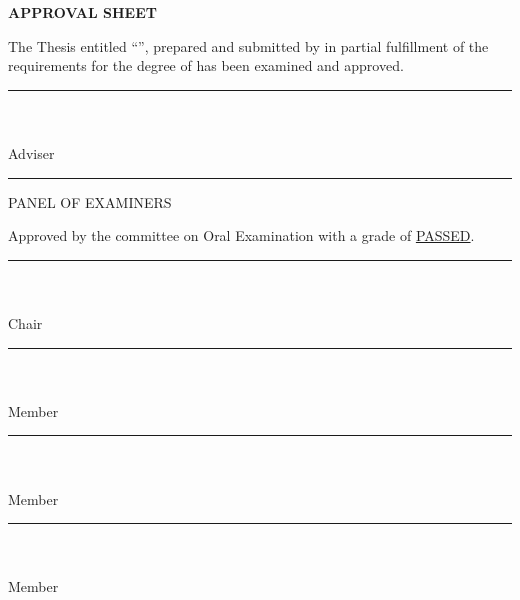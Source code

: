 \ifcitcproposal\else
\clearpage
\thispagestyle{empty}
\begin{center}\textbf{APPROVAL SHEET}\end{center}
\vspace{1\baselineskip}

\begingroup
\setlength{\parindent}{1.25cm}\linespread{1.35}\selectfont
The Thesis entitled ``\textbf{\citcTitleInline}'', prepared and submitted by
\textbf{\citcAuthorsInline} in partial fulfillment of the requirements for the
degree of \textbf{\citcDegree} has been examined and approved.
\par
\endgroup

\vspace{2\baselineskip}
\begin{center}
\rule{7.5cm}{0.4pt}\\
\textbf{\citcAdviser}\\
Adviser
\end{center}

\vspace{1\baselineskip}
\begin{center}\rule{\linewidth}{1.2pt}\end{center}
\begin{center}PANEL OF EXAMINERS\end{center}
\vspace{0.5\baselineskip}
\noindent Approved by the committee on Oral Examination with a grade of
\underline{PASSED}.

\vspace{1.5\baselineskip}
\begin{center}
\rule{7.5cm}{0.4pt}\\
\textbf{\citcChair}\\
Chair
\end{center}

\vspace{1\baselineskip}
\if\relax\detokenize\expandafter{\citcMemberB}\relax
\begin{center}
\rule{7.5cm}{0.4pt}\\
\textbf{\citcMemberA}\\
Member
\end{center}
\else
\noindent\begin{minipage}[t]{0.48\linewidth}\centering
\rule{6cm}{0.4pt}\\
\textbf{\citcMemberA}\\
Member
\end{minipage}\hfill
\begin{minipage}[t]{0.48\linewidth}\centering
\rule{6cm}{0.4pt}\\
\textbf{\citcMemberB}\\
Member
\end{minipage}
\fi

